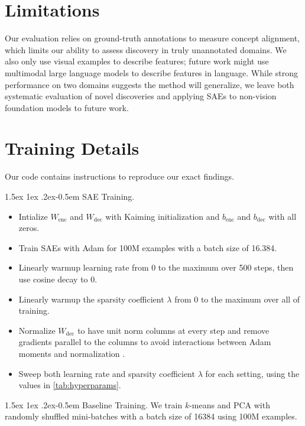 \documentclass[runningheads]{llncs}
\makeatletter
\renewcommand{\paragraph}{%
  \@startsection{paragraph}{4}%
  {\z@}{1.5ex \@plus 1ex \@minus .2ex}{-0.5em}%
  {\normalfont\normalsize\bfseries}%
}
\makeatother
\begin{document}
\section{Limitations}\label{app:limitations}
Our evaluation relies on ground-truth annotations to measure concept alignment, which limits our ability to assess discovery in truly unannotated domains. 
We also only use visual examples to describe features; future work might use multimodal large language models to describe features in language.
While strong performance on two domains suggests the method will generalize, we leave both systematic evaluation of novel discoveries and applying SAEs to non-vision foundation models to future work.


\section{Training Details}\label{app:hyperparameters}

Our code contains instructions to reproduce our exact findings.

\paragraph{SAE Training.}
\begin{itemize}
    \item{Intialize $W_\text{enc}$ and $W_\text{dec}$ with Kaiming initialization \citep{kaiming2015init} and $b_\text{enc}$ and $b_\text{dec}$ with all zeros.}
    \item{Train SAEs with Adam \citep{kingma2014adam} for \num{100}M examples with a batch size of \num{16,384}.}
    \item{Linearly warmup learning rate from \num{0} to the maximum over 500 steps, then use cosine decay to \num{0}.}
    \item{Linearly warmup the sparsity coefficient $\lambda$ from 0 to the maximum over all of training.}
    \item{Normalize $W_\text{dec}$ to have unit norm columns at every step and remove gradients parallel to the columns to avoid interactions between Adam moments and normalization \citep{bricken2023monosemanticity}.}
    \item{Sweep both learning rate and sparsity coefficient $\lambda$ for each setting, using the values in \cref{tab:hyperparams}.}
\end{itemize}


\paragraph{Baseline Training.}
We train $k$-means and PCA with randomly shuffled mini-batches with a batch size of \num{16384} using \num{100}M examples.
\end{document}
